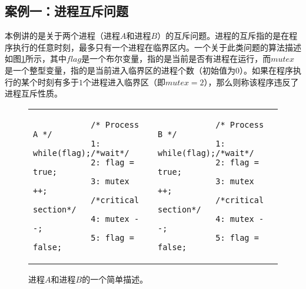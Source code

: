 \subsection{案例一：进程互斥问题}\label{subsec:example}
\begin{example}
	
	本例讲的是关于两个进程（进程$A$和进程$B$）的互斥问题。进程的互斥指的是在程序执行的任意时刻，最多只有一个进程在临界区内。一个关于此类问题的算法描述如图\ref{illustrative:mutual}所示，其中$flag$是一个布尔变量，指的是当前是否有进程在运行，而$mutex$是一个整型变量，指的是当前进入临界区的进程个数（初始值为$0$）。如果在程序执行的某个时刻有多于$1$个进程进入临界区（即$mutex=2$），那么则称该程序违反了进程互斥性质。
	
	\begin{figure}[h!]
		\centering
		\small
		\begin{tabular}{p{5.3cm}p{3.8cm}}
			\begin{verbatim}
			/* Process A */
			1: while(flag);/*wait*/
			2: flag = true;
			3: mutex ++;
			/*critical section*/
			4: mutex --;
			5: flag = false;
			\end{verbatim}
			&
			\begin{verbatim}
			/* Process B */
			1: while(flag);/*wait*/
			2: flag = true;
			3: mutex ++;
			/*critical section*/
			4: mutex --;
			5: flag = false;
			\end{verbatim}
		\end{tabular}
		\label{illustrative:mutual}
		\caption{进程$A$和进程$B$的一个简单描述。}
	\end{figure}
	

\end{example}
